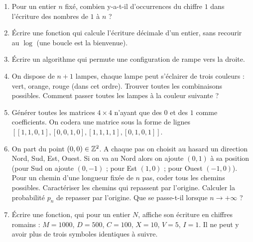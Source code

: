 \begin{frame}
\footnotesize
\vspace*{-1ex}
\begin{miniexercice}
\vspace*{-1ex}
\begin{enumerate}
\setlength{\itemsep}{-1pt}
  \item Pour un entier $n$ fixé, combien y-a-t-il d'occurrences du chiffre $1$ dans
  l'écriture des nombres de $1$ à $n$ ?
  
  \item \'Ecrire une fonction qui calcule l'écriture décimale d'un entier, sans recourir au $\log$
  (une boucle  est la bienvenue).
  
  \item \'Ecrire un algorithme qui permute une configuration de rampe vers la droite.
  
  \item On dispose de $n+1$ lampes, chaque lampe peut s'éclairer de trois couleurs : vert, orange, rouge (dans cet ordre).
  Trouver toutes les combinaisons possibles. Comment passer toutes les lampes à la couleur suivante ?
  
  \item Générer toutes les matrices $4\times 4$ n'ayant que des $0$ et des $1$ comme coefficients. 
  On codera une matrice sous la forme de lignes $[ [1,1,0,1], [0,0,1,0], [1,1,1,1], [0,1,0,1] ]$.

  \item On part du point $(0,0) \in \mathbb{Z}^2$. A chaque pas on choisit au hasard un direction Nord, Sud, Est, Ouest.
  Si on va au Nord alors on ajoute $(0,1)$ à sa position (pour Sud on ajoute $(0,-1)$ ; pour Est $(1,0)$ ; pour Ouest $(-1,0)$).
  Pour un chemin d'une longueur fixée de $n$ pas, coder tous les chemins possibles. Caractériser les chemins qui repassent par l'origine.
  Calculer la probabilité $p_n$ de repasser par l'origine. Que se passe-t-il lorsque $n \to +\infty$ ?
  
  \item \'Ecrire une fonction, qui pour un entier $N$, affiche son écriture en chiffres romains :
  $M = 1000$, $D=500$, $C=100$, $X=10$, $V=5$, $I=1$. Il ne peut y avoir plus de trois symboles identiques à suivre.
 
\end{enumerate}
\vspace*{-2ex}
\end{miniexercice}

\end{frame}

